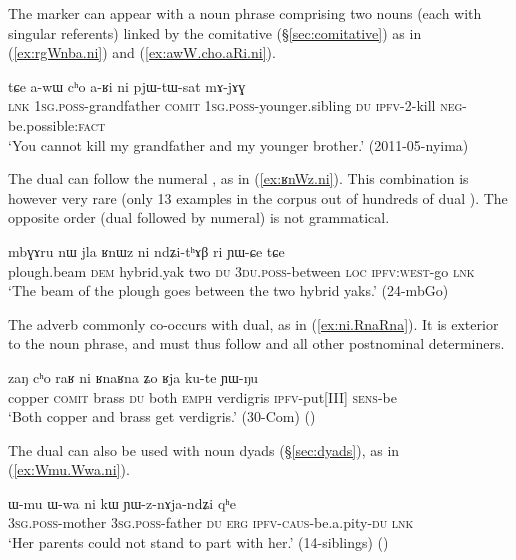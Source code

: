 The marker  can appear with a noun phrase comprising two nouns (each with singular referents) linked by the comitative  (§\ref{sec:comitative}) as in (\ref{ex:rgWnba.ni}) and (\ref{ex:awW.cho.aRi.ni}).

\begin{exe}
	\ex \label{ex:awW.cho.aRi.ni}
	\gll  tɕe a-wɯ cʰo a-ʁi ni pjɯ-tɯ-sat mɤ-jɤɣ \\
	\textsc{lnk} \textsc{1sg}.\textsc{poss}-grandfather \textsc{comit} \textsc{1sg}.\textsc{poss}-younger.sibling \textsc{du} \textsc{ipfv}-2-kill \textsc{neg}-be.possible:\textsc{fact} \\
	\glt `You cannot kill my grandfather and my younger brother.' (2011-05-nyima)
\end{exe}

The dual can follow the numeral , as in (\ref{ex:ʁnWz.ni}). This combination is however very rare (only 13 examples in the corpus out of hundreds of dual ). The opposite order (dual followed by numeral) is not grammatical.

\begin{exe}
\ex \label{ex:ʁnWz.ni}
\gll mbɣɤru nɯ jla ʁnɯz ni ndʑi-tʰɤβ ri ɲɯ-ɕe tɕe \\
plough.beam \textsc{dem} hybrid.yak two \textsc{du} \textsc{3du}.\textsc{poss}-between \textsc{loc} \textsc{ipfv}:\textsc{west}-go \textsc{lnk} \\
\glt `The beam of the plough goes between the two hybrid yaks.' (24-mbGo)
\end{exe}


The adverb  commonly co-occurs with dual, as in (\ref{ex:ni.RnaRna}). It is exterior to the noun phrase, and must thus follow  and all other postnominal determiners.

\begin{exe}
\ex \label{ex:ni.RnaRna}
\gll zaŋ cʰo raʁ ni ʁnaʁna ʑo ʁja ku-te ɲɯ-ŋu \\
copper \textsc{comit} brass \textsc{du} both \textsc{emph} verdigris \textsc{ipfv}-put[III] \textsc{sens}-be \\
\glt `Both copper and brass get verdigris.' (30-Com)
()
\end{exe}

The dual can also be used with noun dyads (§\ref{sec:dyads}), as in (\ref{ex:Wmu.Wwa.ni}). 

\begin{exe}
\ex \label{ex:Wmu.Wwa.ni}
\gll   ɯ-mu ɯ-wa ni kɯ ɲɯ-z-nɤja-ndʑi qʰe \\
\textsc{3sg}.\textsc{poss}-mother \textsc{3sg}.\textsc{poss}-father \textsc{du} \textsc{erg} \textsc{ipfv}-\textsc{caus}-be.a.pity-\textsc{du} \textsc{lnk} \\
\glt `Her parents could not stand to part with her.' (14-siblings) ()
\end{exe}

